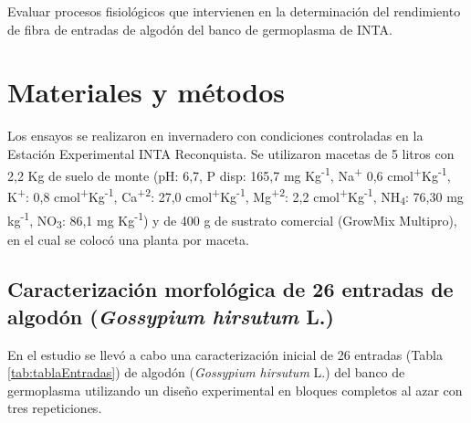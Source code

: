 \documentclass[12pt,oneside]{reedthesis}
\begin{document}
Evaluar procesos fisiológicos que intervienen en la determinación del rendimiento de fibra de entradas de algodón del banco de germoplasma de INTA.

\section{Materiales y métodos}\label{materiales-y-muxe9todos}

Los ensayos se realizaron en invernadero con condiciones controladas en la Estación Experimental INTA Reconquista. Se utilizaron macetas de 5 litros con 2,2 Kg de suelo de monte (pH: 6,7, P disp: 165,7 mg Kg\textsuperscript{-1}, Na\textsuperscript{+} 0,6 cmol\textsuperscript{+}Kg\textsuperscript{-1}, K\textsuperscript{+}: 0,8 cmol\textsuperscript{+}Kg\textsuperscript{-1}, Ca\textsuperscript{+2}: 27,0 cmol\textsuperscript{+}Kg\textsuperscript{-1}, Mg\textsuperscript{+2}: 2,2 cmol\textsuperscript{+}Kg\textsuperscript{-1}, NH\textsubscript{4}: 76,30 mg kg\textsuperscript{-1}, NO\textsubscript{3}: 86,1 mg Kg\textsuperscript{-1}) y de 400 g de sustrato comercial (GrowMix Multipro), en el cual se colocó una planta por maceta.

\subsection{\texorpdfstring{Caracterización morfológica de 26 entradas de algodón (\emph{Gossypium hirsutum} L.)}{Caracterización morfológica de 26 entradas de algodón (Gossypium hirsutum L.)}}\label{caracterizaciuxf3n-morfoluxf3gica-de-26-entradas-de-algoduxf3n-gossypium-hirsutum-l.}

En el estudio se llevó a cabo una caracterización inicial de 26 entradas (Tabla \ref{tab:tablaEntradas}) de algodón (\emph{Gossypium hirsutum} L.) del banco de germoplasma utilizando un diseño experimental en bloques completos al azar con tres repeticiones.
\end{document}
